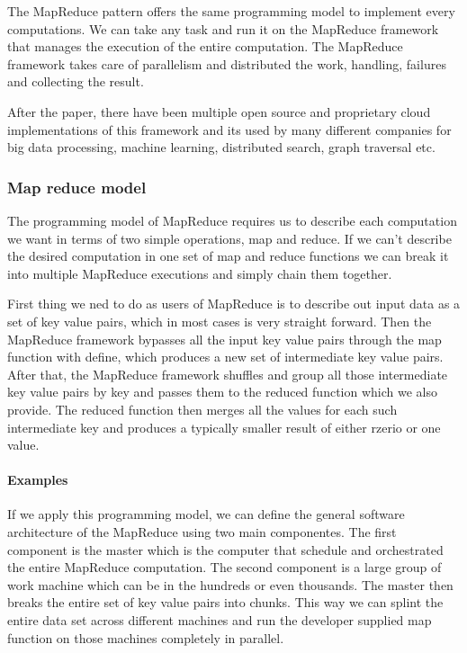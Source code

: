 The MapReduce pattern offers the same programming model to implement every computations.
We can take any task and run it on the MapReduce framework that manages the execution of the entire computation.
The MapReduce framework takes care of parallelism and distributed the work, handling, failures and collecting the result.

After the paper, there have been multiple open source and proprietary cloud implementations of this framework and its used by many different companies for big data processing, machine learning, distributed search, graph traversal etc.

\subsubsection{Map reduce model}
The programming model of MapReduce requires us to describe each computation we want in terms of two simple operations, map and reduce.
If we can't describe the desired computation in one set of map and reduce functions we can break it into multiple MapReduce executions and simply chain them together.

First thing we ned to do as users of MapReduce is to describe out input data as a set of key value pairs, which in most cases is very straight forward.
Then the MapReduce framework bypasses all the input key value pairs through the map function with define, which produces a new set of intermediate key value pairs.
After that, the MapReduce framework shuffles and group all those intermediate key value pairs by key and passes them to the reduced function which we also provide.
The reduced function then merges all the values for each such intermediate key and produces a typically smaller result of either rzerio or one value.

\paragraph{Examples}

If we apply this programming model, we can define the general software architecture of the MapReduce using two main componentes.
The first component is the master which is the computer that schedule and orchestrated the entire MapReduce computation.
The second component is a large group of work machine which can be in the hundreds or even thousands.
The master then breaks the entire set of key value pairs into chunks.
This way we can splint the entire data set across different machines and run the developer supplied map function on those machines completely in parallel.

